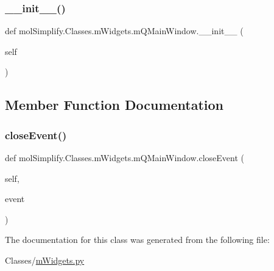 \subsubsection{\texorpdfstring{\+\_\+\+\_\+init\+\_\+\+\_\+()}{\_\_init\_\_()}}
{\footnotesize\ttfamily def mol\+Simplify.\+Classes.\+m\+Widgets.\+m\+Q\+Main\+Window.\+\_\+\+\_\+init\+\_\+\+\_\+ (\begin{DoxyParamCaption}\item[{}]{self }\end{DoxyParamCaption})}



\subsection{Member Function Documentation}
\mbox{\label{classmolSimplify_1_1Classes_1_1mWidgets_1_1mQMainWindow_ad056877a48172e3cdb203fb822058234}} 
\subsubsection{\texorpdfstring{close\+Event()}{closeEvent()}}
{\footnotesize\ttfamily def mol\+Simplify.\+Classes.\+m\+Widgets.\+m\+Q\+Main\+Window.\+close\+Event (\begin{DoxyParamCaption}\item[{}]{self,  }\item[{}]{event }\end{DoxyParamCaption})}



The documentation for this class was generated from the following file\+:\begin{DoxyCompactItemize}
\item 
Classes/\hyperlink{mWidgets_8py}{m\+Widgets.\+py}\end{DoxyCompactItemize}
